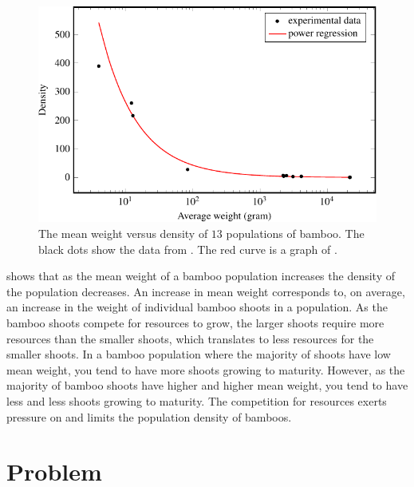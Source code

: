 \documentclass[a4paper,oneside,12pt]{article}
\begin{document}
{\begin{solution}
\begin{figure}[!htbp]
\centering
\includegraphics[scale=1.1]{image/12/bamboo.pdf}
\caption{%
  The mean weight versus density of $13$ populations of bamboo.  The
  black dots show the data from .  The red
  curve is a graph of
  .
}
\label{fig:logarithm:bamboo}
\end{figure}

 shows that as the mean weight of a
bamboo population increases the density of the population decreases.
An increase in mean weight corresponds to, on average, an increase in
the weight of individual bamboo shoots in a population.  As the bamboo
shoots compete for resources to grow, the larger shoots require more
resources than the smaller shoots, which translates to less resources
for the smaller shoots.  In a bamboo population where the majority of
shoots have low mean weight, you tend to have more shoots growing to
maturity.  However, as the majority of bamboo shoots have higher and
higher mean weight, you tend to have less and less shoots growing to
maturity.  The competition for resources exerts pressure on and limits
the population density of bamboos.
\end{solution}
}{}


\newpage

\section*{Problem}
\end{document}
